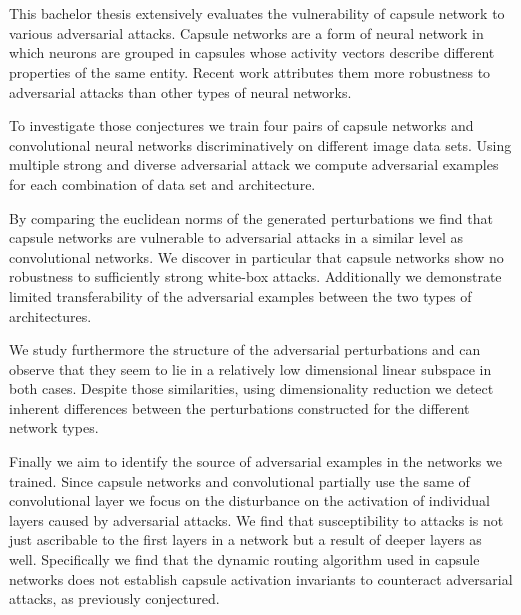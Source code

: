 \section*{}

This bachelor thesis extensively evaluates the vulnerability of capsule network to various adversarial attacks.
Capsule networks are a form of neural network in which neurons are grouped in capsules whose activity vectors describe different properties of the same entity.
Recent work attributes them more robustness to adversarial attacks than other types of neural networks.

To investigate those conjectures we train four pairs of capsule networks and convolutional neural networks discriminatively on different image data sets.
Using multiple strong and diverse adversarial attack we compute adversarial examples for each combination of data set and architecture.

By comparing the euclidean norms of the generated perturbations we find that capsule networks are vulnerable to adversarial attacks in a similar level as convolutional networks.
We discover in particular that capsule networks show no robustness to sufficiently strong white-box attacks.
Additionally we demonstrate limited transferability of the adversarial examples between the two types of architectures.

We study furthermore the structure of the adversarial perturbations and can observe that they seem to lie in a relatively low dimensional linear subspace in both cases.
Despite those similarities, using dimensionality reduction we detect inherent differences between the perturbations constructed for the different network types.

Finally we aim to identify the source of adversarial examples in the networks we trained.
Since capsule networks and convolutional partially use the same of convolutional layer we focus on the disturbance on the activation of individual layers caused by adversarial attacks.
We find that susceptibility to attacks is not just ascribable to the first layers in a network but a result of deeper layers as well.
Specifically we find that the dynamic routing algorithm used in capsule networks does not establish capsule activation invariants to counteract adversarial attacks, as previously conjectured.
